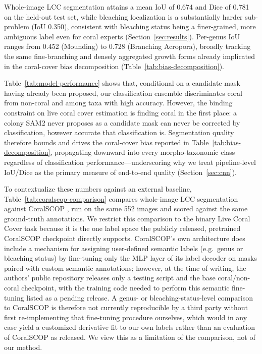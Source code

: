 \documentclass[11pt]{elsarticle}
\begin{document}
Whole-image LCC segmentation attains a mean IoU of 0.674 and Dice of 0.781 on the held-out test set, while bleaching localization is a substantially harder sub-problem (IoU 0.350), consistent with bleaching status being a finer-grained, more ambiguous label even for coral experts (Section~\ref{sec:results}). Per-genus IoU ranges from 0.452 (Mounding) to 0.728 (Branching Acropora), broadly tracking the same fine-branching and densely aggregated growth forms already implicated in the coral-cover bias decomposition (Table~\ref{tab:bias-decomposition}).

Table~\ref{tab:model-performance} shows that, conditional on a candidate mask having already been proposed, our classification ensemble discriminates coral from non-coral and among taxa with high accuracy. However, the binding constraint on live coral cover estimation is finding coral in the first place: a colony SAM2 never proposes as a candidate mask can never be corrected by classification, however accurate that classification is. Segmentation quality therefore bounds and drives the coral-cover bias reported in Table~\ref{tab:bias-decomposition}, propagating downward into every morpho-taxonomic class regardless of classification performance---underscoring why we treat pipeline-level IoU/Dice as the primary measure of end-to-end quality (Section~\ref{sec:cnn}).

To contextualize these numbers against an external baseline, Table~\ref{tab:coralscop-comparison} compares whole-image LCC segmentation against CoralSCOP \citep{zheng2024}, run on the same 552 images and scored against the same ground-truth annotations. We restrict this comparison to the binary Live Coral Cover task because it is the one label space the publicly released, pretrained CoralSCOP checkpoint directly supports. CoralSCOP's own architecture does include a mechanism for assigning user-defined semantic labels (e.g.\ genus or bleaching status) by fine-tuning only the MLP layer of its label decoder on masks paired with custom semantic annotations; however, at the time of writing, the authors' public repository releases only a testing script and the base coral/non-coral checkpoint, with the training code needed to perform this semantic fine-tuning listed as a pending release. A genus- or bleaching-status-level comparison to CoralSCOP is therefore not currently reproducible by a third party without first re-implementing that fine-tuning procedure ourselves, which would in any case yield a customized derivative fit to our own labels rather than an evaluation of CoralSCOP as released. We view this as a limitation of the comparison, not of our method.
\end{document}
